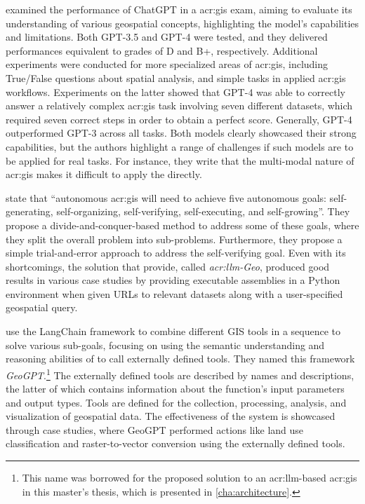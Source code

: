 \cite{mooneyUnderstandingGeospatialSkills2023} examined the performance of ChatGPT in a \acrshort{acr:gis} exam, aiming to evaluate its understanding of various geospatial concepts, highlighting the model's capabilities and limitations. Both GPT-3.5 and GPT-4 were tested, and they delivered performances equivalent to grades of D and B+, respectively. Additional experiments were conducted for more specialized areas of \acrshort{acr:gis}, including True/False questions about spatial analysis, and simple tasks in applied \acrshort{acr:gis} workflows. Experiments on the latter showed that GPT-4 was able to correctly answer a relatively complex \acrshort{acr:gis} task involving seven different datasets, which required seven correct steps in order to obtain a perfect score. Generally, GPT-4 outperformed GPT-3 across all tasks. Both models clearly showcased their strong capabilities, but the authors highlight a range of challenges if such models are to be applied for real tasks. For instance, they write that the multi-modal nature of \acrshort{acr:gis} makes it difficult to apply the  directly.

\cite{liAutonomousGISNextgeneration2023} state that \enquote{autonomous \acrshort{acr:gis} will need to achieve five autonomous goals: self-generating, self-organizing, self-verifying, self-executing, and self-growing}. They propose a divide-and-conquer-based method to address some of these goals, where they split the overall problem into sub-problems. Furthermore, they propose a simple trial-and-error approach to address the self-verifying goal. Even with its shortcomings, the solution that \citeauthor{liAutonomousGISNextgeneration2023} provide, called \textit{\acrshort{acr:llm}-Geo}, produced good results in various case studies by providing executable assemblies in a Python environment when given URLs to relevant datasets along with a user-specified geospatial query.

\cite{zhangGeoGPTUnderstandingProcessing2023} use the LangChain framework to combine different GIS tools in a sequence to solve various sub-goals, focusing on using the semantic understanding and reasoning abilities of  to call externally defined tools. They named this framework \textit{GeoGPT}.\footnote{This name was borrowed for the proposed solution to an \acrshort{acr:llm}-based \acrshort{acr:gis} in this master's thesis, which is presented in \autoref{cha:architecture}.} The externally defined tools are described by names and descriptions, the latter of which contains information about the function's input parameters and output types. Tools are defined for the collection, processing, analysis, and visualization of geospatial data. The effectiveness of the system is showcased through case studies, where GeoGPT performed actions like land use classification and raster-to-vector conversion using the externally defined tools.


